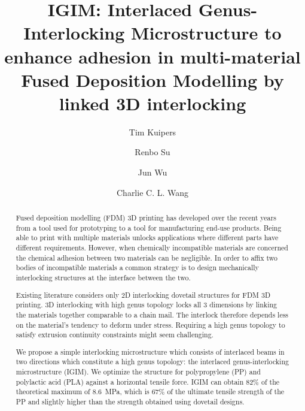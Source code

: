 \documentclass[5p,twocolumn,10pt,times]{elsarticle}
\theoremstyle{definition}
\begin{document}
\baselineskip11pt 

\begin{frontmatter} 

\title{IGIM: Interlaced Genus-Interlocking Microstructure to enhance adhesion in multi-material Fused Deposition Modelling by linked 3D interlocking}


\author[um,tud]{Tim Kuipers}
\author[man]{Renbo Su}
\author[tud]{Jun Wu}
\author[man]{Charlie C. L. Wang}
\address[um]{Ultimaker, Utrecht, The Netherlands}
\address[tud]{Department of Sustainable Design Engineering, Delft University of Technology, The Netherlands}
\address[man]{Department of Mechanical, Aerospace \& Civil Engineering, The University of Manchester, United Kingdom}


\begin{abstract}
Fused deposition modelling (FDM) 3D printing has developed over the recent years from a tool used for prototyping to a tool for manufacturing end-use products.
Being able to print with multiple materials unlocks applications where different parts have different requirements.
However, when chemically incompatible materials are concerned the chemical adhesion between two materials can be negligible.
In order to affix two bodies of incompatible materials a common strategy is to design mechanically interlocking structures at the interface between the two.

Existing literature considers only 2D interlocking dovetail structures for FDM 3D printing.
3D interlocking with high genus topology locks all 3 dimensions by linking the materials together comparable to a chain mail.
The interlock therefore depends less on the material's tendency to deform under stress.
Requiring a high genus topology to satisfy extrusion continuity constraints might seem challenging.

We propose a simple interlocking microstructure which consists of interlaced beams in two directions which constitute a high genus topology: the interlaced genus-interlocking microstructure (IGIM).
We optimize the structure for polypropylene (PP) and polylactic acid (PLA) against a horizontal tensile force.
IGIM can obtain 82\% of the theoretical maximum of \SI{8.6}{\mega\pascal}, which is 67\% of the ultimate tensile strength of the PP and slightly higher than the strength obtained using dovetail designs.


\end{abstract}
\end{frontmatter}
\end{document}
